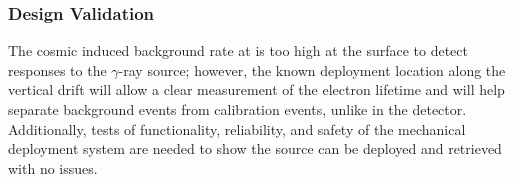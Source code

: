 




\subsubsection{ Design Validation}
The cosmic induced background rate at  is too high at the surface to detect responses to the  $\gamma$-ray source; however, the known deployment location along the vertical drift will allow a clear measurement of the electron lifetime and will help separate background events from calibration events, unlike in the  detector. Additionally, tests of functionality, reliability, and safety of the mechanical deployment system are needed to show the source can be deployed and retrieved with no issues.

